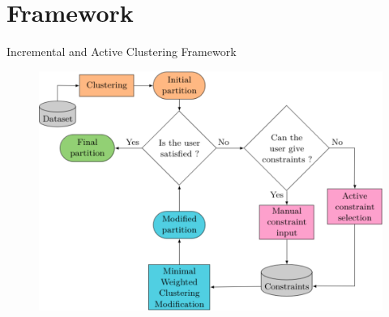 \documentclass{beamer}
\begin{document}
\section{Framework}

\begin{frame}{Incremental and Active Clustering Framework}


\begin{figure}[htpb]
    \begin{center}
        \includegraphics[width=0.8\linewidth]{./images/scheme.png}
    \end{center}
\end{figure}


\end{frame}
\end{document}

